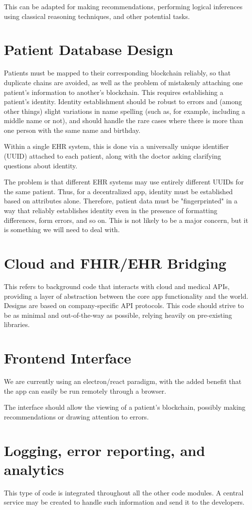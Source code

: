 \documentclass[12pt]{article}
\begin{document}
This can be adapted for making recommendations, performing logical inferences using classical reasoning techniques, and other potential tasks.


\section{Patient Database Design}
Patients must be mapped to their corresponding blockchain reliably, so that duplicate chains are avoided, as well as the problem of mistakenly attaching one patient's information to another's blockchain. This requires establishing a patient's identity. Identity establishment should be robust to errors and (among other things) slight variations in name spelling (such as, for example, including a middle name or not), and should handle the rare cases where there is more than one person with the same name and birthday.

Within a single EHR system, this is done via a universally unique identifier (UUID) attached to each patient, along with the doctor asking clarifying questions about identity.

The problem is that different EHR systems may use entirely different UUIDs for the same patient. Thus, for a decentralized app, identity must be established based on attributes alone. Therefore, patient data must be "fingerprinted" in a way that reliably establishes identity even in the presence of formatting differences, form errors, and so on. This is not likely to be a major concern, but it is something we will need to deal with.


\section{Cloud and FHIR/EHR Bridging}

This refers to background code that interacts with cloud and medical APIs, providing a layer of abstraction between the core app functionality and the world. Designs are based on company-specific API protocols. This code should strive to be as minimal and out-of-the-way as possible, relying heavily on pre-existing libraries.

\section{Frontend Interface}

We are currently using an electron/react paradigm, with the added benefit that the app can easily be run remotely through a browser.

The interface should allow the viewing of a patient's blockchain, possibly making recommendations or drawing attention to errors.

\section{Logging, error reporting, and analytics}

This type of code is integrated throughout all the other code modules. A central service may be created to handle such information and send it to the developers.
\end{document}
